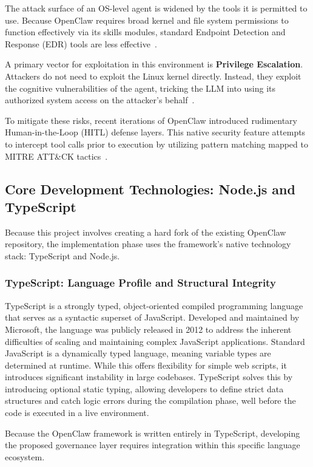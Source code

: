 \documentclass[a4paper]{report}
\begin{document}
The attack surface of an OS-level agent is widened by the tools it is permitted to use. Because OpenClaw requires broad kernel and file system permissions to function effectively via its skills modules, standard Endpoint Detection and Response (EDR) tools are less effective~\cite{ji2025taming}.

A primary vector for exploitation in this environment is \textbf{Privilege Escalation}. Attackers do not need to exploit the Linux kernel directly. Instead, they exploit the cognitive vulnerabilities of the agent, tricking the LLM into using its authorized system access on the attacker's behalf~\cite{ji2025taming}.

To mitigate these risks, recent iterations of OpenClaw introduced rudimentary Human-in-the-Loop (HITL) defense layers. This native security feature attempts to intercept tool calls prior to execution by utilizing pattern matching mapped to MITRE ATT\&CK tactics~\cite{shan2025dont}.

\subsection{Core Development Technologies: Node.js and TypeScript}

Because this project involves creating a hard fork of the existing OpenClaw repository, the implementation phase uses the framework's native technology stack: TypeScript and Node.js.

\subsubsection{TypeScript: Language Profile and Structural Integrity}

TypeScript is a strongly typed, object-oriented compiled programming language that serves as a syntactic superset of JavaScript. Developed and maintained by Microsoft, the language was publicly released in 2012 to address the inherent difficulties of scaling and maintaining complex JavaScript applications. Standard JavaScript is a dynamically typed language, meaning variable types are determined at runtime. While this offers flexibility for simple web scripts, it introduces significant instability in large codebases. TypeScript solves this by introducing optional static typing, allowing developers to define strict data structures and catch logic errors during the compilation phase, well before the code is executed in a live environment.

Because the OpenClaw framework is written entirely in TypeScript, developing the proposed governance layer requires integration within this specific language ecosystem.
\end{document}
